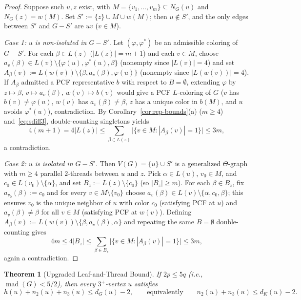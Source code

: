 \documentclass[11pt,a4paper]{article}
\newtheorem{theorem}{Theorem}[section]
\theoremstyle{definition}
\newcommand{\mad}{\operatorname{mad}}
\begin{document}
\begin{proof}
Suppose such $u, z$ exist, with $M = \{v_1,\dots,v_m\} \subseteq N_G(u)$ and $N_G(z) = w(M)$. Set $S' := \{z\} \cup M \cup w(M)$; then $u \notin S'$, and the only edges between $S'$ and $G - S'$ are $uv$ ($v \in M$).

\emph{Case 1: $u$ is non-isolated in $G - S'$.} Let $(\varphi, \varphi^*)$ be an admissible coloring of $G - S'$. For each $\beta \in L(z)$ ($|L(z)| = m+1$) and each $v \in M$, choose $a_v(\beta) \in L(v) \setminus \{\varphi(u), \varphi^*(u), \beta\}$ (nonempty since $|L(v)| = 4$) and set $A_\beta(v) := L(w(v)) \setminus \{\beta, a_v(\beta), \varphi(u)\}$ (nonempty since $|L(w(v))| = 4$). If $A_\beta$ admitted a PCF representative $b$ with respect to $B = \emptyset$, extending $\varphi$ by $z \mapsto \beta$, $v \mapsto a_v(\beta)$, $w(v) \mapsto b(v)$ would give a PCF $L$-coloring of $G$ ($v$ has $b(v) \neq \varphi(u)$, $w(v)$ has $a_v(\beta) \neq \beta$, $z$ has a unique color in $b(M)$, and $u$ avoids $\varphi^*(u)$), contradiction. By Corollary~\ref{cor:rep-bounds}(a) ($m \ge 4$) and~\eqref{eq:sdiff3}, double-counting singletons yields
\[
  4(m + 1) = 4|L(z)| \le \sum_{\beta \in L(z)} \bigl|\{v \in M : |A_\beta(v)| = 1\}\bigr| \le 3m,
\]
a contradiction.

\emph{Case 2: $u$ is isolated in $G - S'$.} Then $V(G) = \{u\} \cup S'$ is a generalized $\Theta$-graph with $m \ge 4$ parallel $2$-threads between $u$ and $z$. Pick $\alpha \in L(u)$, $v_0 \in M$, and $c_0 \in L(v_0) \setminus \{\alpha\}$, and set $B_z := L(z) \setminus \{c_0\}$ (so $|B_z| \ge m$). For each $\beta \in B_z$, fix $a_{v_0}(\beta) := c_0$ and for every $v \in M \setminus \{v_0\}$ choose $a_v(\beta) \in L(v) \setminus \{\alpha, c_0, \beta\}$; this ensures $v_0$ is the unique neighbor of $u$ with color $c_0$ (satisfying PCF at $u$) and $a_v(\beta) \neq \beta$ for all $v \in M$ (satisfying PCF at $w(v)$). Defining $A_\beta(v) := L(w(v)) \setminus \{\beta, a_v(\beta), \alpha\}$ and repeating the same $B = \emptyset$ double-counting gives
\[
  4m \le 4|B_z| \le \sum_{\beta \in B_z} \bigl|\{v \in M : |A_\beta(v)| = 1\}\bigr| \le 3m,
\]
again a contradiction.
\end{proof}

\begin{theorem}[Upgraded Leaf-and-Thread Bound]\label{thm:leaf-thread}
If $2p \le 5q$ (i.e., $\mad(G) < 5/2$), then every $3^+$-vertex $u$ satisfies
\[
  h(u) + n_2(u) + n_3(u) \le d_G(u) - 2, \qquad \text{equivalently} \qquad n_2(u) + n_3(u) \le d_K(u) - 2.
\]
\end{theorem}
\end{document}
